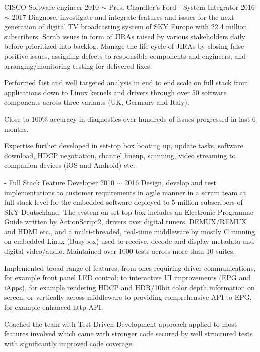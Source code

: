 \begin{cventries}
  \cventry
    {CISCO}
    {Software engineer}
    {2010 $\sim$ Pres.}
    {Chandler's Ford}
    {}
  \cventryX
    {- System Integrator}
    {2016 $\sim$ 2017}
    {Diagnose, investigate and integrate features and issues for the next generation of digital TV broadcasting system of SKY Europe with 22.4 million subscribers. Scrub issues in form of JIRAs raised by various stakeholders daily before prioritized into backlog. Manage the life cycle of JIRAs by closing false positive issues, assigning defects to responsible components and engineers, and arranging/monitoring testing for delivered fixes.}
    {
      \begin{cvitems}
        \item {Performed fast and well targeted analysis in end to end scale on full stack from applications down to Linux kernels and drivers through over 50 software components across three variants (UK, Germany and Italy).}
        \item{Close to 100\% accuracy in diagnostics over hundreds of issues progressed in last 6 months.}
        \item{Expertise further developed in set-top box booting up, update tasks, software download, HDCP negotiation, channel lineup, scanning, video streaming to companion devices (iOS and Android) etc.}
      \end{cvitems}
    }
  \cventryX
    {- Full Stack Feature Developer}
    {2010 $\sim$ 2016}
    {Design, develop and test implementations to customer requirements in agile manner in a scrum team at full stack level for the embedded software deployed to 5 million subscribers of SKY Deutschland. The system on set-top box includes an Electronic Programme Guide written by ActionScript2, drivers over digital tuners, DEMUX/REMUX and HDMI etc., and a multi-threaded, real-time middleware by mostly C running on embedded Linux (Busybox) used to receive, decode and display metadata and digital video/audio. Maintained over 1000 tests across more than 10 suites.}
    {
      \begin{cvitems}
        \item {Implemented broad range of features, from ones requiring driver communications, for example front panel LED control; to interactive UI improvements (EPG and iApps), for example rendering HDCP and HDR/10bit color depth information on screen; or vertically across middleware to providing comprehensive API to EPG, for example enhanced http API.}
        \item {Coached the team with Test Driven Development approach applied to most features involved which came with stronger code secured by well structured tests with significantly improved code coverage.}

\end{cvitems}}
\end{cventries}
